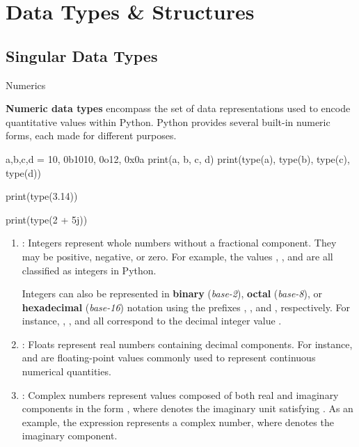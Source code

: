 \documentclass[10pt]{article}
\begin{document}
\section{Data Types \& Structures}

  \subsection{Singular Data Types}

    \begin{core}{Numerics}

      \textbf{Numeric data types} encompass the set of data representations used to encode quantitative values within Python. Python provides several built-in numeric forms, each made for different purposes.

      \begin{pyconsole}

        a,b,c,d = 10, 0b1010, 0o12, 0x0a
        print(a, b, c, d)
        print(type(a), type(b), type(c), type(d))

        print(type(3.14))

        print(type(2 + 5j))

      \end{pyconsole}

      \begin{enumerate}

        \item {}: Integers represent whole numbers without a fractional component. They may be positive, negative, or zero. For example, the values , , and  are all classified as integers in Python.
        
        Integers can also be represented in \textbf{binary} (\textit{base-2}), \textbf{octal} (\textit{base-8}), or \textbf{hexadecimal} (\textit{base-16}) notation using the prefixes , , and , respectively. For instance, , , and  all correspond to the decimal integer value .

        \item {}: Floats represent real numbers containing decimal components. For instance,  and  are floating-point values commonly used to represent continuous numerical quantities.

        \item {}: Complex numbers represent values composed of both real and imaginary components in the form , where  denotes the imaginary unit satisfying . As an example, the expression  represents a complex number, where  denotes the imaginary component.

      \end{enumerate}

    \end{core}
\end{document}
